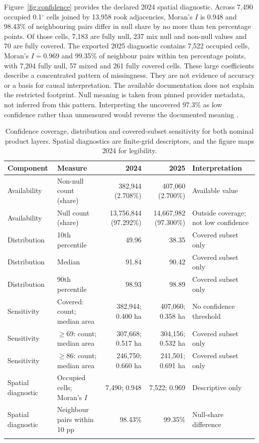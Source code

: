 \documentclass[pdflatex,sn-basic]{sn-jnl}
\begin{document}
Figure~\ref{fig:confidence} provides the declared 2024 spatial diagnostic. Across 7,490 occupied 0.1$^{\circ}$ cells joined by 13,958 rook adjacencies, Moran's $I$ is 0.948 and 98.43\% of neighbouring pairs differ in null share by no more than ten percentage points. Of those cells, 7,183 are fully null, 237 mix null and non-null values and 70 are fully covered. The exported 2025 diagnostic contains 7,522 occupied cells, Moran's $I=0.969$ and 99.35\% of neighbour pairs within ten percentage points, with 7,204 fully null, 57 mixed and 261 fully covered cells. These large coefficients describe a concentrated pattern of missingness. They are not evidence of accuracy or a basis for causal interpretation. The available documentation does not explain the restricted footprint. Null meaning is taken from pinned provider metadata, not inferred from this pattern. Interpreting the uncovered 97.3\% as low confidence rather than unmeasured would reverse the documented meaning \citep{devillers_towards_2007,peng_call_2021}.

\begin{table}[t]
\caption{Confidence coverage, distribution and covered-subset sensitivity for both nominal product layers. Spatial diagnostics are finite-grid descriptors, and the figure maps 2024 for legibility.}\label{tab:confidence}
\centering
\footnotesize
\setlength{\tabcolsep}{3pt}
\begin{tabularx}{\textwidth}{@{}p{}YrrY@{}}
\toprule
Component & Measure & 2024 & 2025 & Interpretation \\
\midrule
Availability & Non-null count (share) & 382,944 (2.708\%) & 407,060 (2.700\%) & Available value \\
Availability & Null count (share) & 13,756,844 (97.292\%) & 14,667,982 (97.300\%) & Outside coverage; not low confidence \\
Distribution & 10th percentile & 49.96 & 38.35 & Covered subset only \\
Distribution & Median & 91.84 & 90.42 & Covered subset only \\
Distribution & 90th percentile & 98.93 & 98.89 & Covered subset only \\
Sensitivity & Covered: count; median area & 382,944; 0.400 ha & 407,060; 0.358 ha & No confidence threshold \\
Sensitivity & $\geq69$: count; median area & 307,668; 0.517 ha & 304,156; 0.532 ha & Covered subset only \\
Sensitivity & $\geq86$: count; median area & 246,750; 0.660 ha & 241,501; 0.691 ha & Covered subset only \\
Spatial diagnostic & Occupied cells; Moran's $I$ & 7,490; 0.948 & 7,522; 0.969 & Descriptive only \\
Spatial diagnostic & Neighbour pairs within 10 pp & 98.43\% & 99.35\% & Null-share difference \\
\botrule
\end{tabularx}
\end{table}
\end{document}
